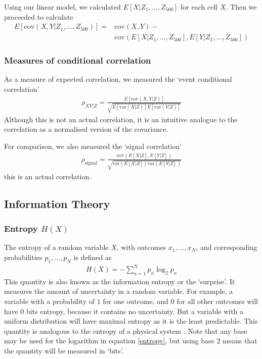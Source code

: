 \documentclass[a4paper,12pt]{article}
\theoremstyle{definition}
\newcommand{\cov}{\text{cov}} %
\newcommand{\var}{\text{var}} %
\begin{document}
        Using our linear model, we calculated $E[X|Z_1,\dots, Z_{500}]$ for each cell $X$. Then we proceeded to calculate
        \begin{align}
            E[\cov(X,Y|Z_1,\dots, Z_{500})] = & \cov(X,Y) - \\
              & \cov(E[X|Z_1,\dots, Z_{500}], E[Y|Z_1,\dots, Z_{500}])
        \end{align}

        \subsubsection{Measures of conditional correlation}\label{sec:cond_corr}
        As a measure of expected correlation, we measured the `event conditional correlation' \cite{maugis}
        \begin{align}\label{eq:event_conditional_correlation}
            \rho_{XY|Z} = \frac{E[\cov(X,Y|Z)]}{\sqrt{E[\var(X|Z)]E[\var(Y|Z)]}}
        \end{align}
        Although this is not an actual correlation, it is an intuitive analogue to the correlation as a normalised version of the covariance.

        For comparison, we also measured the `signal correlation'
        \begin{align}\label{eq:signal_correlation}
            \rho_{\text{signal}} = \frac{\cov(E[X|Z], E[Y|Z])}{\sqrt{\var(E[X|Z])\var(E[Y|Z])}}
        \end{align}
        this is an actual correlation.

    \subsection{Information Theory}\label{sec:information_theory}
        \subsubsection{Entropy $H(X)$}
        The entropy of a random variable $X$, with outcomes $x_1, \dots, x_N$, and corresponding probabilities $p_1, \dots, p_N$ is defined as
        \begin{align}\label{entropy}
        H(X) = -\sum_{n=1}^N p_n \log _2 p_n
        \end{align}
        This quantity is also known as the information entropy or the `surprise'. It measures the amount of uncertainty in a random variable. For example, a variable with a probability of $1$ for one outcome, and $0$ for all other outcomes will have 0 bits entropy, because it contains no uncertainty. But a variable with a uniform distribution will have maximal entropy as it is the least predictable. This quantity is analogous to the entropy of a physical system \cite{shannon}. Note that any base may be used for the logarithm in equation \ref{entropy}, but using base $2$ means that the quantity will be measured in `bits'.
\end{document}
